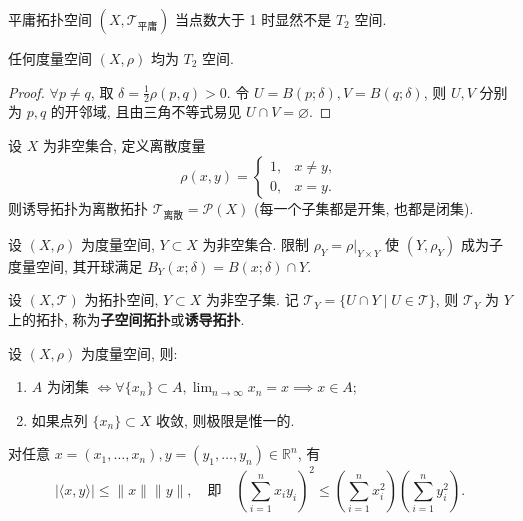 \begin{example}\label{ex:7.1.3}
平庸拓扑空间 $(X, \mathcal{T}_{\text{平庸}})$ 当点数大于 1 时显然不是 $T_2$ 空间.
\end{example}

\begin{lemma}\label{lem:7.1.2}
任何度量空间 $(X, \rho)$ 均为 $T_2$ 空间.
\end{lemma}

\begin{proof}
$\forall p \neq q$, 取 $\delta = \frac{1}{2}\rho(p, q) > 0$. 令 $U = B(p; \delta), V = B(q; \delta)$, 则 $U, V$ 分别为 $p, q$ 的开邻域, 且由三角不等式易见 $U \cap V = \varnothing$. \qedhere
\end{proof}

\begin{example}\label{ex:7.1.4}
设 $X$ 为非空集合, 定义离散度量
\[
  \rho(x, y) = \begin{cases}
    1, & x \neq y, \\
    0, & x = y.
  \end{cases}
\]
则诱导拓扑为离散拓扑 $\mathcal{T}_{\text{离散}} = \mathcal{P}(X)$ (每一个子集都是开集, 也都是闭集).
\end{example}

\begin{example}\label{ex:7.1.5}
设 $(X, \rho)$ 为度量空间, $Y \subset X$ 为非空集合. 限制 $\rho_Y = \rho|_{Y \times Y}$ 使 $(Y, \rho_Y)$ 成为子度量空间, 其开球满足 $B_Y(x; \delta) = B(x; \delta) \cap Y$.
\end{example}

\begin{example}\label{ex:7.1.6}
设 $(X, \mathcal{T})$ 为拓扑空间, $Y \subset X$ 为非空子集. 记 $\mathcal{T}_Y = \{U \cap Y \mid U \in \mathcal{T}\}$, 则 $\mathcal{T}_Y$ 为 $Y$ 上的拓扑, 称为\textbf{子空间拓扑}或\textbf{诱导拓扑}.
\end{example}

\begin{corollary}\label{cor:7.1.1}
设 $(X, \rho)$ 为度量空间, 则:
\begin{enumerate}
  \item $A$ 为闭集 $\iff \forall \{x_n\} \subset A, \lim_{n \to \infty} x_n = x \implies x \in A$;
  \item 如果点列 $\{x_n\} \subset X$ 收敛, 则极限是惟一的.
\end{enumerate}
\end{corollary}

\begin{lemma}\label{lem:7.1.3}
对任意 $x = (x_1, \dots, x_n), y = (y_1, \dots, y_n) \in \mathbb{R}^n$, 有
\[
  |\langle x, y \rangle| \leqslant \|x\| \|y\|, \quad\text{即}\quad
  \left(\sum_{i=1}^n x_i y_i\right)^2 \leqslant \left(\sum_{i=1}^n x_i^2\right) \left(\sum_{i=1}^n y_i^2\right).
\]
\end{lemma}

